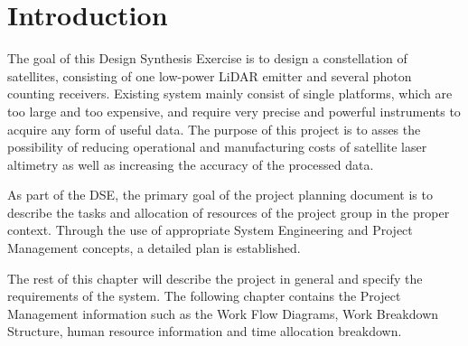 \section{Introduction}
\label{dsePPIntro}
The goal of this Design Synthesis Exercise is to design a constellation of satellites, consisting of one low-power LiDAR emitter and several photon counting receivers. Existing system mainly consist of single platforms, which are too large and too expensive, and require very precise and powerful instruments to acquire any form of useful data. The purpose of this project is to asses the possibility of reducing operational and manufacturing costs of satellite laser altimetry as well as increasing the accuracy of the processed data.

As part of the DSE, the primary goal of the project planning document is to describe the tasks and allocation of resources of the project group in the proper context. Through the use of appropriate System Engineering and Project Management concepts, a detailed plan is established.

The rest of this chapter will describe the project in general and specify the requirements of the system. The following chapter contains the Project Management information such as the Work Flow Diagrams, Work Breakdown Structure, human resource information and time allocation breakdown. 